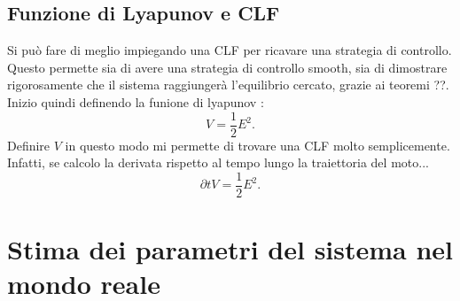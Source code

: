 \subsection{Funzione di Lyapunov e CLF}
Si può fare di meglio impiegando una CLF per ricavare una strategia di controllo. Questo permette sia di avere una strategia di controllo smooth, sia di dimostrare rigorosamente che il sistema raggiungerà l'equilibrio cercato, grazie ai teoremi ??. Inizio quindi definendo la funione di lyapunov :
\begin{equation}
    V = \frac 1 2 E^2.
    \label{eq:lyapunov-energy}
\end{equation}
Definire $V$ in questo modo mi permette di trovare una CLF molto semplicemente. Infatti, se calcolo la derivata rispetto al tempo lungo la traiettoria del moto...
\begin{equation}
    \partial t V = \frac 1 2 E^2.
    \label{eq:lyapunov-energy}
\end{equation}



\section{Stima dei parametri del sistema nel mondo reale}